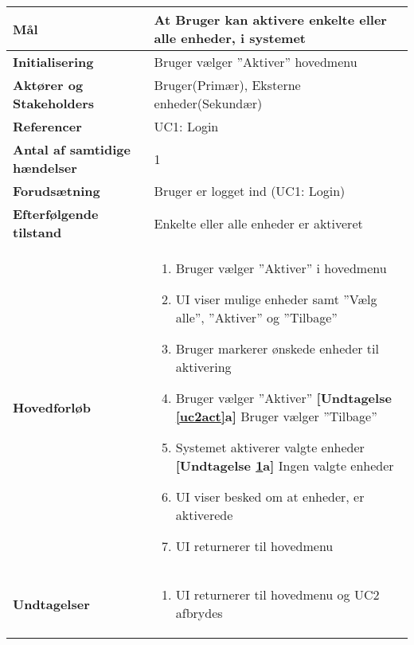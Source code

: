 \begin{table}[H] \centering
	\begin{tabular} {|p{6cm}|p{8cm}|}
	\hline		
		\textbf{Mål}							&At Bruger kan aktivere enkelte eller alle enheder, i systemet\\\hline
		\textbf{Initialisering}				&Bruger vælger ''Aktiver'' hovedmenu  	\\\hline
		\textbf{Aktører og Stakeholders}		&Bruger(Primær), Eksterne enheder(Sekundær) 		\\\hline
		\textbf{Referencer}					&UC1: Login					\\\hline
		\textbf{Antal af samtidige hændelser}&1 							\\\hline
		\textbf{Forudsætning}				&Bruger er logget ind (UC1: Login)\\\hline
		\textbf{Efterfølgende tilstand}		&Enkelte eller alle enheder er aktiveret  \\\hline
		\textbf{Hovedforløb}					
			&\begin{enumerate}				
					
				\item Bruger vælger ''Aktiver'' i hovedmenu
										
				\item \label{uc2menu}UI viser mulige enheder samt ''Vælg alle'', ''Aktiver'' og ''Tilbage''
												
				\item Bruger markerer ønskede enheder til aktivering
												
				\item \label{uc2act} Bruger vælger ''Aktiver''\newline
					\textbf{[Undtagelse \ref{uc2act}a]} Bruger vælger ''Tilbage''
												
				\item \label{uc2sysact} Systemet aktiverer valgte enheder \newline
					\textbf{[Undtagelse \ref{uc2sysact}a]} Ingen valgte enheder
				
				\item UI viser besked om at enheder, er aktiverede
																	
				\item UI returnerer til hovedmenu
												
			\end{enumerate}\\ \hline
		
		\textbf{Undtagelser}	
		
		&\begin{enumerate}[label= \ref{uc2act}a.]
			\item UI returnerer til hovedmenu og UC2 afbrydes
		\end{enumerate}						
							

\end{tabular}
\end{table}
